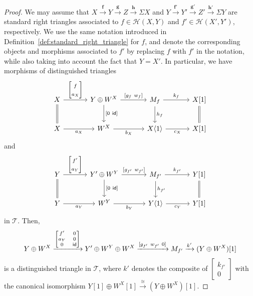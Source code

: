 \documentclass[a4paper,reqno,10pt]{amsart}
\theoremstyle{definition}
\theoremstyle{definition}
\theoremstyle{definition}
\theoremstyle{definition}
\theoremstyle{plain}
\newcommand{\id}{\mathsf{id}}
\newcommand{\CH}{\mathcal{H}}
\newcommand{\CT}{\mathcal{T}}
\begin{document}
\begin{proof}
We may assume that 
$X\xrightarrow{\mathbf{f}}Y\xrightarrow{\mathbf{g}}Z\xrightarrow{\mathbf{h}}\Sigma X$ and 
$Y\xrightarrow{\mathbf{f}'}Y'\xrightarrow{\mathbf{g}'}Z'\xrightarrow{\mathbf{h}'}\Sigma Y$
are standard right triangles
associated to $f\in\CH(X,Y)$ and $f'\in\CH(X',Y')$, respectively. We use the same notation introduced in Definition~\ref{def:standard_right_triangle} for $f$, and denote the corresponding objects and morphisms associated to $f'$ by replacing $f$ with $f'$ in the notation, while also taking into account the fact that $Y=X'$.
In particular, we have morphisms of distinguished triangles
\[
\begin{tikzcd}[row sep=0.8cm, column sep=1.2cm]
X \arrow{r}{\begin{bmatrix}f\\ a_X\end{bmatrix}}\arrow[d, equal]
&Y\oplus W^X \arrow{d}{{[}0\ \id{]}} \arrow{r}{{[}g_f\ w_f{]}}
&M_f\arrow{r}{k_f} \arrow{d}{h_f}
&X{[}1{]} \arrow[d, equal]
\\
X\arrow{r}[swap]{a_X}
&W^X\arrow{r}[swap]{b_X}
&X \langle1\rangle \arrow{r}[swap]{c_X}
&X{[}1{]}
\end{tikzcd}\]
and
\[
\begin{tikzcd}[row sep=0.8cm, column sep=1.2cm]
Y \arrow{r}{\begin{bmatrix}f'\\ a_Y\end{bmatrix}}\arrow[d, equal]
&Y'\oplus W^Y \arrow{d}{{[}0\ \id{]}} \arrow{r}{{[}g_{f'}\ w_{f'}{]}}
&M_{f'}\arrow{r}{k_{f'}} \arrow{d}{h_{f'}}
&Y{[}1{]} \arrow[d, equal]
\\
Y\arrow{r}[swap]{a_Y}
&W^Y\arrow{r}[swap]{b_Y}
&Y \langle1\rangle \arrow{r}[swap]{c_Y}
&Y{[}1{]}
\end{tikzcd}
\]
in $\CT$.
Then,
\[
Y\oplus W^X\xrightarrow{{\scriptsize\begin{bmatrix}f'&0\\ a_Y&0\\0&\id\end{bmatrix}}}Y'\oplus W^Y\oplus W^X\xrightarrow{[g_{f'}\ w_{f'}\ 0]}M_{f'}\xrightarrow{k'} (Y\oplus W^X)[1]
\]
is a distinguished triangle in $\CT$, where $k'$ denotes the composite of $\begin{bmatrix}k_{f'}\\0\end{bmatrix}$ with the canonical isomorphism $Y[1]\oplus W^X[1]\xrightarrow{\cong}(Y\oplus W^X)[1]$.


\end{proof}
\end{document}
